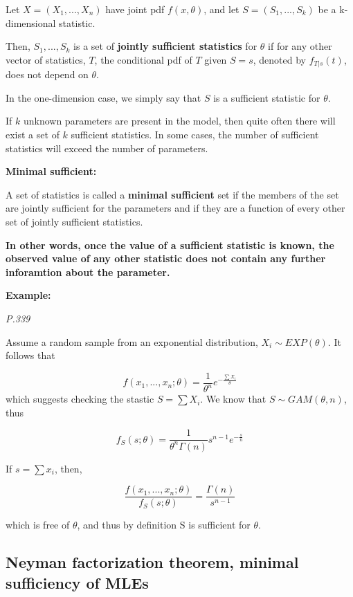 \documentclass[]{book}
\begin{document}
Let \(X=(X_1,...,X_n)\) have joint pdf \(f(x,\theta)\), and let \(S=(S_1,...,S_k)\) be a k-dimensional statistic.

Then, \(S_1,...,S_k\) is a set of \textbf{jointly sufficient statistics} for \(\theta\) if for any other vector of statistics, \(T\), the conditional pdf of \(T\) given \(S=s\), denoted by \(f_{T|s}(t)\), does not depend on \(\theta\).

In the one-dimension case, we simply say that \(S\) is a sufficient statistic for \(\theta\).

If \(k\) unknown parameters are present in the model, then quite often there will exist a set of \(k\) sufficient statistics. In some cases, the number of sufficient statistics will exceed the number of parameters.

\textbf{Minimal sufficient:}

A set of statistics is called a \textbf{minimal sufficient} set if the members of the set are jointly sufficient for the parameters and if they are a function of every other set of jointly sufficient statistics.

\textbf{In other words, once the value of a sufficient statistic is known, the observed value of any other statistic does not contain any further inforamtion about the parameter.}

\textbf{Example:}

\emph{P.339}

Assume a random sample from an exponential distribution, \(X_i \sim EXP(\theta)\). It follows that

\[f(x_1,...,x_n; \theta)=\frac{1}{\theta^n} e^{-\frac{\sum X_i}{\theta}}\]
which suggests checking the stastic \(S=\sum X_i\). We know that \(S \sim GAM(\theta,n)\), thus

\[f_S(s; \theta)=\frac{1}{\theta^n \Gamma(n)}s^{n-1}e^{-\frac{s}{n}}\]

If \(s=\sum x_i\), then,

\[\frac{f(x_1,...,x_n; \theta)}{f_S(s;\theta)}=\frac{\Gamma(n)}{s^{n-1}}\]

which is free of \(\theta\), and thus by definition S is sufficient for \(\theta\).

\hypertarget{neyman-factorization-theorem-minimal-sufficiency-of-mles}{%
\subsection{Neyman factorization theorem, minimal sufficiency of MLEs}\label{neyman-factorization-theorem-minimal-sufficiency-of-mles}}
\end{document}
